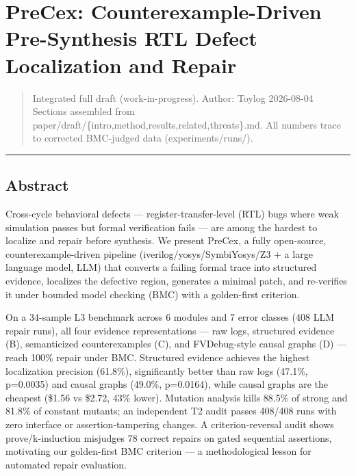 \documentclass[
  11pt,
]{article}
\author{}
\date{}
\begin{document}
\section{PreCex: Counterexample-Driven Pre-Synthesis RTL Defect Localization and Repair}\label{precex-counterexample-driven-pre-synthesis-rtl-defect-localization-and-repair}

\begin{quote}
Integrated full draft (work-in-progress). Author: Toylog \textbar{} 2026-08-04 Sections assembled from paper/draft/\{intro,method,results,related,threats\}.md. All numbers trace to corrected BMC-judged data (experiments/runs/).
\end{quote}

\begin{center}\rule{0.5\linewidth}{0.5pt}\end{center}

\subsection{Abstract}\label{abstract}

Cross-cycle behavioral defects --- register-transfer-level (RTL) bugs where weak simulation passes but formal verification fails --- are among the hardest to localize and repair before synthesis. We present PreCex, a fully open-source, counterexample-driven pipeline (iverilog/yosys/SymbiYosys/Z3 + a large language model, LLM) that converts a failing formal trace into structured evidence, localizes the defective region, generates a minimal patch, and re-verifies it under bounded model checking (BMC) with a golden-first criterion.

On a 34-sample L3 benchmark across 6 modules and 7 error classes (408 LLM repair runs), all four evidence representations --- raw logs, structured evidence (B), semanticized counterexamples (C), and FVDebug-style causal graphs (D) --- reach 100\% repair under BMC. Structured evidence achieves the highest localization precision (61.8\%), significantly better than raw logs (47.1\%, p=0.0035) and causal graphs (49.0\%, p=0.0164), while causal graphs are the cheapest (\$1.56 vs \$2.72, 43\% lower). Mutation analysis kills 88.5\% of strong and 81.8\% of constant mutants; an independent T2 audit passes 408/408 runs with zero interface or assertion-tampering changes. A criterion-reversal audit shows prove/k-induction misjudges 78 correct repairs on gated sequential assertions, motivating our golden-first BMC criterion --- a methodological lesson for automated repair evaluation.
\end{document}

